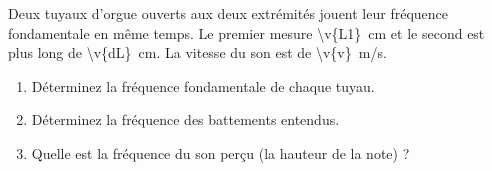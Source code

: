 Deux tuyaux d'orgue ouverts aux deux extrémités jouent leur fréquence fondamentale en même temps. Le premier mesure \qty{\v{L1}}{cm} et le second est plus long de \qty{\v{dL}}{cm}. La vitesse du son est de \qty{\v{v}}{m/s}.

\begin{enumerate}[label=\alph*)]
    \item Déterminez la fréquence fondamentale de chaque tuyau.
    \item Déterminez la fréquence des battements entendus.
    \item Quelle est la fréquence du son perçu (la hauteur de la note) ?
\end{enumerate}
